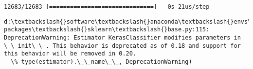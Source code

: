 \documentclass[11pt]{article}
\begin{document}
    \begin{Verbatim}[commandchars=\\\{\}]
12683/12683 [==============================] - 0s 21us/step

    \end{Verbatim}

    \begin{Verbatim}[commandchars=\\\{\}]
d:\textbackslash{}software\textbackslash{}anaconda\textbackslash{}envs\textbackslash{}tensorflow\textbackslash{}lib\textbackslash{}site-packages\textbackslash{}sklearn\textbackslash{}base.py:115: DeprecationWarning: Estimator KerasClassifier modifies parameters in \_\_init\_\_. This behavior is deprecated as of 0.18 and support for this behavior will be removed in 0.20.
  \% type(estimator).\_\_name\_\_, DeprecationWarning)

    \end{Verbatim}
\end{document}
